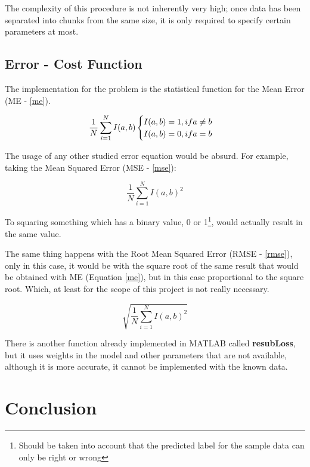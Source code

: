 \documentclass[11pt]{article}
\begin{document}
The complexity of this procedure is not inherently very high; once data has been
separated into chunks from the same size, it is only required to specify certain
parameters at most.

\subsection{Error - Cost Function}

The implementation for the problem is the statistical function for the Mean 
Error (ME - \hyperref[me]{\ref{me}}).

\begin{equation}
 \centering
 \frac{1}{N} \sum_{i=1}^{N} {I(a, b)} \label{me}

 \begin{cases}
  I(a, b) = 1, if a \neq b\\
  I(a, b) = 0, if a = b
 \end{cases}
\end{equation}

The usage of any other studied error equation would be absurd. For example,
taking the Mean Squared Error (MSE - \hyperref[mse]{\ref{mse}}):

\begin{equation}
 \frac{1}{N} \sum_{i=1}^{N} {I(a, b)^2} \label{mse}
\end{equation}

To squaring something which has a binary value, 0 or 1\footnote{Should be taken
into account that the predicted label for the sample data can only be right or
wrong}, would actually result in the same value. 

The same thing happens with the Root Mean Squared Error (RMSE - 
\hyperref[rmse]{\ref{rmse}}), only in this case, it would be with the square 
root of the same result that would be obtained with ME (Equation 
\hyperref[me]{\ref{me}}), but in this case proportional to the square root. 
Which, at least for the scope of this project is not really necessary.

\begin{equation}
 \sqrt{\frac{1}{N} \sum_{i=1}^{N} {I(a, b)^2}} \label{rmse}
\end{equation}

There is another function already implemented in MATLAB called 
\textbf{resubLoss}, but it uses weights in the model and other parameters that 
are not available, although it is more accurate, it cannot be implemented with
the known data.

\section{Conclusion}
\end{document}
